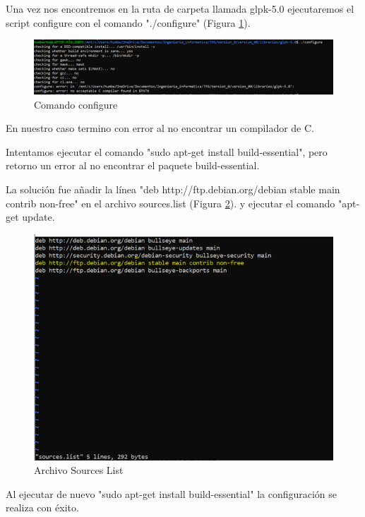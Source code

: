 \documentclass[11pt]{article}
\begin{document}
Una vez nos encontremos en la ruta de carpeta llamada glpk-5.0 ejecutaremos el script configure con el comando "./configure" (Figura \ref{fig:configure}).

\begin{figure}[h!] 
\centering
    \includegraphics[width=1\textwidth]{img/configure.png}
\caption{Comando configure}
\label{fig:configure}
\end{figure}

En nuestro caso termino con error al no encontrar un compilador de C.

Intentamos ejecutar el comando "sudo apt-get install build-essential", pero retorno un error al no encontrar el paquete build-essential.

La solución fue añadir la línea "deb http://ftp.debian.org/debian stable main contrib non-free" en el archivo sources.list (Figura \ref{fig:sourceslist}). y ejecutar el comando "apt-get update.


\begin{figure}[h!] 
\centering
    \includegraphics[width=1\textwidth]{img/sourceslist.png}
\caption{Archivo Sources List}
\label{fig:sourceslist}
\end{figure}

Al ejecutar de nuevo "sudo apt-get install build-essential" la configuración se realiza con éxito. 
\end{document}
